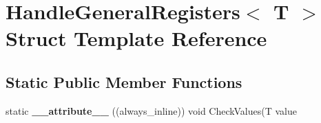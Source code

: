 \hypertarget{structHandleGeneralRegisters}{\section{Handle\-General\-Registers$<$ T $>$ Struct Template Reference}
\label{structHandleGeneralRegisters}
}
\subsection*{Static Public Member Functions}
\begin{DoxyCompactItemize}
\item 
\hypertarget{structHandleGeneralRegisters_a7c8491409c3a41d3ba9321ec80f5bad7}{static {\bfseries \-\_\-\-\_\-attribute\-\_\-\-\_\-} ((always\-\_\-inline)) void Check\-Values(T value}\label{structHandleGeneralRegisters_a7c8491409c3a41d3ba9321ec80f5bad7}

\end{DoxyCompactItemize}
